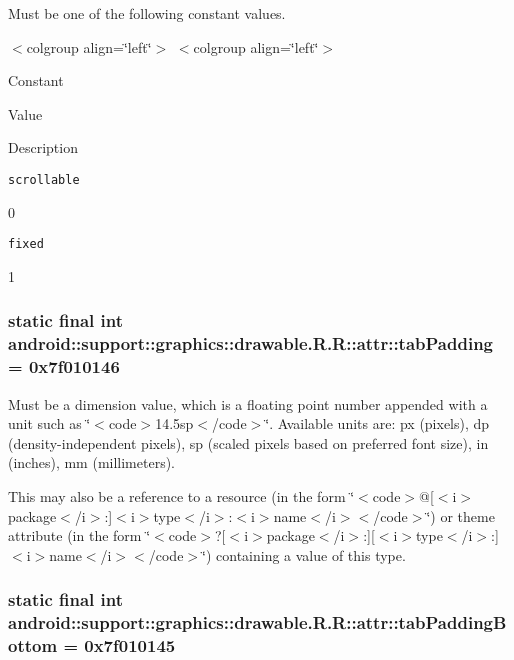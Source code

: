 Must be one of the following constant values. \begin{TabularC}{0}
\hline
\end{TabularC}
$<$colgroup align=\char`\"{}left\char`\"{}$>$ $<$colgroup align=\char`\"{}left\char`\"{}$>$ 

Constant

Value

Description 

{\tt scrollable}

0

{\tt fixed}

1\hypertarget{classandroid_1_1support_1_1graphics_1_1drawable_1_1_r_1_1attr_b090fa56e3aa97223f82dd1d9bc88b09}{
\subsubsection[{tabPadding}]{\setlength{\rightskip}{0pt plus 5cm}static final int android::support::graphics::drawable.R.R::attr::tabPadding = 0x7f010146}}
\label{classandroid_1_1support_1_1graphics_1_1drawable_1_1_r_1_1attr_b090fa56e3aa97223f82dd1d9bc88b09}


Must be a dimension value, which is a floating point number appended with a unit such as \char`\"{}$<$code$>$14.5sp$<$/code$>$\char`\"{}. Available units are: px (pixels), dp (density-independent pixels), sp (scaled pixels based on preferred font size), in (inches), mm (millimeters). 

This may also be a reference to a resource (in the form \char`\"{}$<$code$>$@\mbox{[}$<$i$>$package$<$/i$>$:\mbox{]}$<$i$>$type$<$/i$>$:$<$i$>$name$<$/i$>$$<$/code$>$\char`\"{}) or theme attribute (in the form \char`\"{}$<$code$>$?\mbox{[}$<$i$>$package$<$/i$>$:\mbox{]}\mbox{[}$<$i$>$type$<$/i$>$:\mbox{]}$<$i$>$name$<$/i$>$$<$/code$>$\char`\"{}) containing a value of this type. \hypertarget{classandroid_1_1support_1_1graphics_1_1drawable_1_1_r_1_1attr_11d23bd1271346ec959016307c0eb4e8}{
\subsubsection[{tabPaddingBottom}]{\setlength{\rightskip}{0pt plus 5cm}static final int android::support::graphics::drawable.R.R::attr::tabPaddingBottom = 0x7f010145}}
\label{classandroid_1_1support_1_1graphics_1_1drawable_1_1_r_1_1attr_11d23bd1271346ec959016307c0eb4e8}


